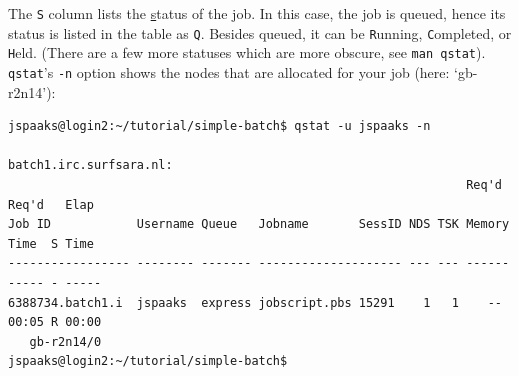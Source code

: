 The \lstinline[style=bashinline]{S} column lists the \underline{s}tatus of the job. In this case, the job is queued, hence its status is listed in the table as \lstinline[style=bashinline]{Q}. Besides queued, it can be \lstinline[style=bashinline]{R}unning, \lstinline[style=bashinline]{C}ompleted, or \lstinline[style=bashinline]{H}eld. (There are a few more statuses which are more obscure, see \lstinline[style=bashinline]{man qstat}). \lstinline[style=bashinline]{qstat}'s \lstinline[style=bashinline]{-n} option shows the nodes that are allocated for your job (here: `gb-r2n14'):%

\begin{lstlisting}[style=basic,style=bash]
jspaaks@login2:~/tutorial/simple-batch$ qstat -u jspaaks -n

batch1.irc.surfsara.nl:
                                                                Req'd  Req'd   Elap
Job ID            Username Queue   Jobname       SessID NDS TSK Memory Time  S Time
----------------- -------- ------- -------------------- --- --- ------ ----- - -----
6388734.batch1.i  jspaaks  express jobscript.pbs 15291    1   1    --  00:05 R 00:00
   gb-r2n14/0
jspaaks@login2:~/tutorial/simple-batch$
\end{lstlisting}
